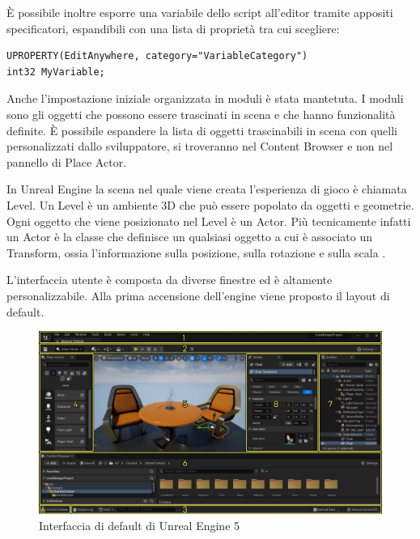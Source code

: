 È possibile inoltre esporre una variabile dello script all'editor tramite appositi specificatori, espandibili con una lista di proprietà tra cui scegliere:

\begin{lstlisting}[caption = Specificatore UPROPERTY per esporre una variabile all'editor]
UPROPERTY(EditAnywhere, category="VariableCategory")
int32 MyVariable;
\end{lstlisting}

Anche l'impostazione iniziale organizzata in moduli è stata mantetuta.
%
I moduli sono gli oggetti che possono essere trascinati in scena e che hanno funzionalità definite.
%
È possibile espandere la lista di oggetti trascinabili in scena con quelli personalizzati dallo sviluppatore, si troveranno nel Content Browser e non nel pannello di Place Actor.

In Unreal Engine la scena nel quale viene creata l'esperienza di gioco è chiamata Level.
%
Un Level è un ambiente 3D che può essere popolato da oggetti e geometrie.
%
Ogni oggetto che viene posizionato nel Level è un Actor.
%
Più tecnicamente infatti un Actor è la classe che definisce un qualsiasi oggetto a cui è associato un Transform, ossia l'informazione sulla posizione, sulla rotazione e sulla scala \cite{ULevelEditor}.

L'interfaccia utente è composta da diverse finestre ed è altamente personalizzabile.
%
Alla prima accensione dell'engine viene proposto il layout di default.

\begin{figure}[!ht]
    \centering
    \includegraphics[height=6cm]{figure/02-default-interface-windows.jpg}
    \caption{Interfaccia di default di Unreal Engine 5}
\end{figure}

